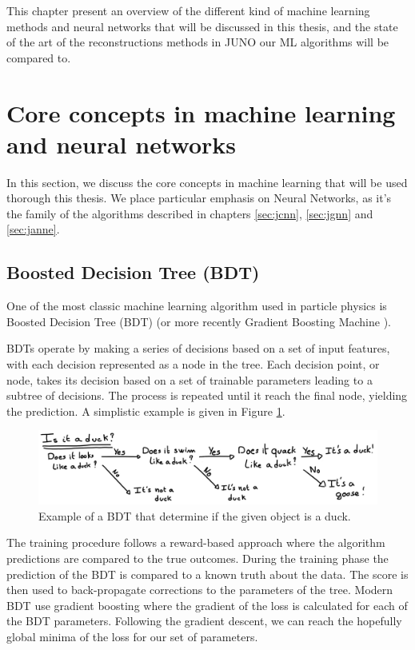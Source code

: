 \documentclass[../main.tex]{subfiles}
\begin{document}
This chapter present an overview of the different kind of machine learning methods and neural networks that will be discussed in this thesis, and the state of the art of the reconstructions methods in JUNO our ML algorithms will be compared to.

\section{Core concepts in machine learning and neural networks}

In this section, we discuss the core concepts in machine learning that will be used thorough this thesis. We place particular emphasis on Neural Networks, as it's the family of the algorithms described in chapters \ref{sec:jcnn}, \ref{sec:jgnn} and \ref{sec:janne}.

\subsection{Boosted Decision Tree (BDT)}
\label{sec:ml:bdt}

One of the most classic machine learning algorithm used in particle physics is Boosted Decision Tree (BDT) \cite{breiman_classification_2017} (or more recently Gradient Boosting Machine \cite{friedman_greedy_2001}).

BDTs operate by making a series of decisions based on a set of input features, with each decision represented as a node in the tree.
Each decision point, or node, takes its decision based on a set of trainable parameters leading to a subtree of decisions. The process is repeated until it reach the final node, yielding the prediction. A simplistic example is given in Figure \ref{fig:ml:bdt}.

\begin{figure}
  \centering
  \includegraphics[width=\linewidth]{images/ml/Bdt.jpg}
  \caption{Example of a BDT that determine if the given object is a duck.}
  \label{fig:ml:bdt}
\end{figure}

The training procedure follows a reward-based approach where the algorithm predictions are compared to the true outcomes.
During the training phase the prediction of the BDT is compared to a known truth about the data. The score is then used to back-propagate corrections to the parameters of the tree. Modern BDT use gradient boosting where the gradient of the loss is calculated for each of the BDT parameters. Following the gradient descent, we can reach the hopefully global minima of the loss for our set of parameters.
\end{document}
